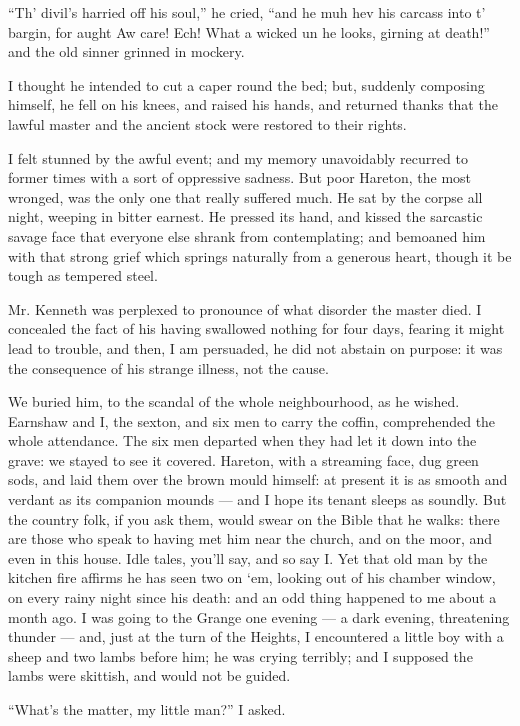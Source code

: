 \par “Th' divil's harried off his soul,” he cried, “and he muh hev his carcass into t' bargin, for aught Aw care! Ech! What a wicked un he looks, girning at death!” and the old sinner grinned in mockery.
\par I thought he intended to cut a caper round the bed; but, suddenly composing himself, he fell on his knees, and raised his hands, and returned thanks that the lawful master and the ancient stock were restored to their rights.
\par I felt stunned by the awful event; and my memory unavoidably recurred to former times with a sort of oppressive sadness. But poor Hareton, the most wronged, was the only one that really suffered much. He sat by the corpse all night, weeping in bitter earnest. He pressed its hand, and kissed the sarcastic savage face that everyone else shrank from contemplating; and bemoaned him with that strong grief which springs naturally from a generous heart, though it be tough as tempered steel.
\par Mr. Kenneth was perplexed to pronounce of what disorder the master died. I concealed the fact of his having swallowed nothing for four days, fearing it might lead to trouble, and then, I am persuaded, he did not abstain on purpose: it was the consequence of his strange illness, not the cause.
\par We buried him, to the scandal of the whole neighbourhood, as he wished. Earnshaw and I, the sexton, and six men to carry the coffin, comprehended the whole attendance. The six men departed when they had let it down into the grave: we stayed to see it covered. Hareton, with a streaming face, dug green sods, and laid them over the brown mould himself: at present it is as smooth and verdant as its companion mounds — and I hope its tenant sleeps as soundly. But the country folk, if you ask them, would swear on the Bible that he walks: there are those who speak to having met him near the church, and on the moor, and even in this house. Idle tales, you'll say, and so say I. Yet that old man by the kitchen fire affirms he has seen two on ‘em, looking out of his chamber window, on every rainy night since his death: and an odd thing happened to me about a month ago. I was going to the Grange one evening — a dark evening, threatening thunder — and, just at the turn of the Heights, I encountered a little boy with a sheep and two lambs before him; he was crying terribly; and I supposed the lambs were skittish, and would not be guided.
\par “What's the matter, my little man?” I asked.
